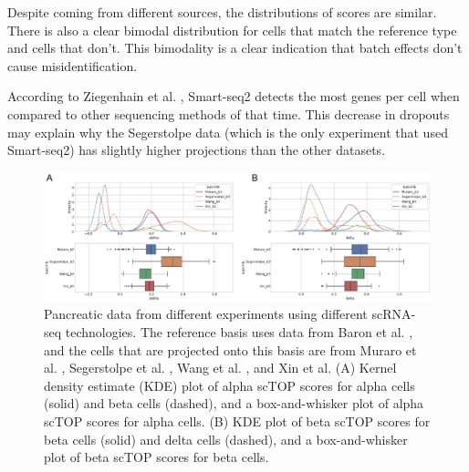 \documentclass[12pt,american]{scrartcl}
\begin{document}
\begin{revresponse}
\begin{changes}
        Despite coming from different sources, the distributions of scores are similar. There is also a clear bimodal distribution for cells that match the reference type and cells that don't. This bimodality is a clear indication that batch effects don't cause misidentification.
        
        According to Ziegenhain et al. \cite{ziegenhain2017comparative}, Smart-seq2 detects the most genes per cell when compared to other sequencing methods of that time. This decrease in dropouts may explain why the Segerstolpe data (which is the only experiment that used Smart-seq2) has slightly higher projections than the other datasets.
    \end{changes}

    \begin{figure}
	\centering
    \includegraphics[scale=0.95]{figs/batch effects.pdf}
	\caption{Pancreatic data from different experiments using different scRNA-seq technologies. The reference basis uses data from Baron et al. \cite{baron2016single}, and the cells that are projected onto this basis are from Muraro et al. \cite{muraro2016single}, Segerstolpe et al. \cite{segerstolpe2016single}, Wang et al. \cite{wang2016single}, and Xin et al. \cite{xin2016rna} (A) Kernel density estimate (KDE) plot of alpha scTOP scores for alpha cells (solid) and beta cells (dashed), and a box-and-whisker plot of alpha scTOP scores for alpha cells. (B) KDE plot of beta scTOP scores for beta cells (solid) and delta cells (dashed), and a box-and-whisker plot of beta scTOP scores for beta cells. }
	\label{batch effects}
    \end{figure}
\end{revresponse}
\end{document}
